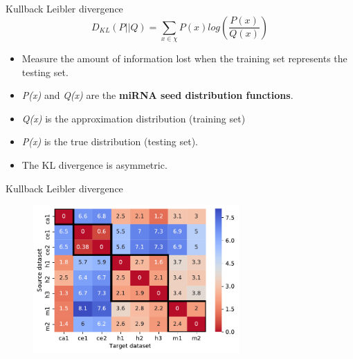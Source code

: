 \documentclass{beamer}
\begin{document}
\begin{frame}{Kullback Leibler divergence}
\begin{equation*}
 D_{KL} \left (P ||Q \right ) = \sum_{x\in \chi }{P\left ( x \right )log\left ( \frac{P\left ( x \right )}{Q\left ( x \right )} \right )}\label{eq:1}
\end{equation*}

  
\begin{itemize}
\item Measure the amount of information lost when the training set represents the testing set.
\item  \textit{P(x)} and \textit{Q(x)} are the \textbf{miRNA seed distribution functions}. 
\item \textit{Q(x)} is the approximation distribution (training set) 
\item \textit{P(x)} is the true distribution (testing set). 
\item The KL divergence is asymmetric.
\end{itemize}


\end{frame}



\begin{frame}{Kullback Leibler divergence}

\begin{figure}[h!]
      \includegraphics[width = 0.7\textwidth]{images/4_divergence_reverse.pdf}
      \label{fig:divergence}
      
      \end{figure}
\end{frame}
\end{document}
